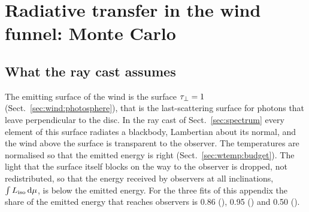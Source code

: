 
\section{Radiative transfer in the wind funnel: Monte Carlo}
\label{app:mc}

\subsection{What the ray cast assumes}
\label{app:mc:raycast}

The emitting surface of the wind is the surface $\tau_\perp = 1$ (Sect.~\ref{sec:wind:photosphere}), that is the last-scattering surface for photons that leave perpendicular to the disc.
In the ray cast of Sect.~\ref{sec:spectrum} every element of this surface radiates a blackbody, Lambertian about its normal, and the wind above the surface is transparent to the observer.
The temperatures are normalised so that the emitted energy is right (Sect.~\ref{sec:wtemp:budget}).
The light that the surface itself blocks on the way to the observer is dropped, not redistributed, so that the energy received by observers at all inclinations, $\int L_{\rm iso}\,{\rm d}\mu$, is below the emitted energy.
For the three fits of this appendix the share of the emitted energy that reaches observers is 0.86 (\srcHoIX), 0.95 (\srcNGCthirteen) and 0.50 (\srcNGCfiftyfour).

